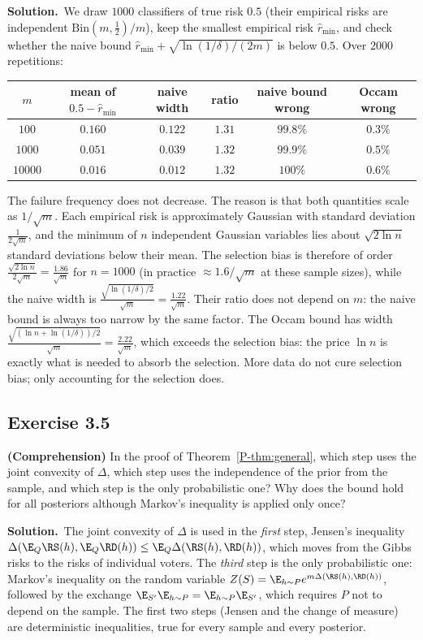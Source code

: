 \documentclass[11pt]{article}
\newcommand{\statement}[1]{\begin{tcolorbox}[enhanced,breakable,colback=black!3,colframe=black!25,boxrule=0.4pt,sharp corners,fontupper=\itshape\small]#1\end{tcolorbox}}
\newcommand{\exo}[1]{\Needspace{6\baselineskip}\subsection*{Exercise #1}\addcontentsline{toc}{subsection}{Exercise #1}}
\newcommand{\sol}{\noindent\textbf{Solution.}\ }
\begin{document}
\sol We draw $1000$ classifiers of true risk $0.5$ (their empirical risks are independent $\mathrm{Bin}(m,\frac12)/m$),
keep the smallest empirical risk $\hat r_{\min}$, and check whether the naive bound $\hat r_{\min}+\sqrt{\ln(1/\delta)/(2m)}$ is
below $0.5$. Over $2000$ repetitions:
\begin{center}\small
\begin{tabular}{cccccc}
\toprule
$m$ & mean of $0.5-\hat r_{\min}$ & naive width & ratio & naive bound wrong & Occam wrong \\
\midrule
$100$ & $0.160$ & $0.122$ & $1.31$ & $99.8\%$ & $0.3\%$ \\
$1000$ & $0.051$ & $0.039$ & $1.32$ & $99.9\%$ & $0.5\%$ \\
$10000$ & $0.016$ & $0.012$ & $1.32$ & $100\%$ & $0.6\%$ \\
\bottomrule
\end{tabular}
\end{center}
The failure frequency does not decrease. The reason is that both quantities scale as $1/\sqrt m$. Each empirical risk
is approximately Gaussian with standard deviation $\frac{1}{2\sqrt m}$, and the minimum of $n$ independent Gaussian
variables lies about $\sqrt{2\ln n}$ standard deviations below their mean. The selection bias is therefore of order
$\frac{\sqrt{2\ln n}}{2\sqrt m}=\frac{1.86}{\sqrt m}$ for $n=1000$ (in practice $\approx1.6/\sqrt m$ at these sample sizes), while
the naive width is $\frac{\sqrt{\ln(1/\delta)/2}}{\sqrt m}=\frac{1.22}{\sqrt m}$. Their ratio does not depend on $m$: the naive bound
is always too narrow by the same factor. The Occam bound has width $\frac{\sqrt{(\ln n+\ln(1/\delta))/2}}{\sqrt m}=\frac{2.22}{\sqrt m}$,
which exceeds the selection bias: the price $\ln n$ is exactly what is needed to absorb the selection. More data do not
cure selection bias; only accounting for the selection does.

\exo{3.5}
\statement{\textbf{(Comprehension)} In the proof of Theorem~\ref{P-thm:general}, which step uses the joint convexity of $\Delta$,
which step uses the independence of the prior from the sample, and which step is the only probabilistic one? Why does the
bound hold for all posteriors although Markov's inequality is applied only once?}

\sol The joint convexity of $\Delta$ is used in the \emph{first} step, Jensen's inequality
$\Delta(\E_Q\RS(h),\E_Q\RD(h))\leq\E_Q\Delta(\RS(h),\RD(h))$, which moves from the Gibbs risks to the risks of individual voters.
The \emph{third} step is the only probabilistic one: Markov's inequality on the random variable
$Z(S)=\E_{h\sim P}e^{m\Delta(\RS(h),\RD(h))}$, followed by the exchange $\E_{S'}\E_{h\sim P}=\E_{h\sim P}\E_{S'}$, which requires $P$ not to
depend on the sample. The first two steps (Jensen and the change of measure) are deterministic inequalities, true for
every sample and every posterior.
\end{document}
